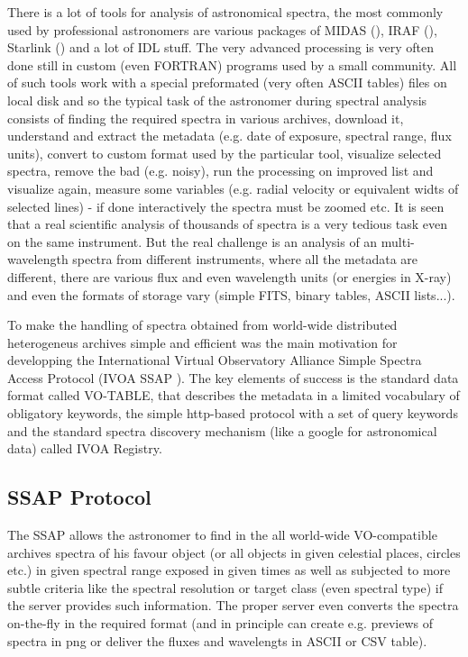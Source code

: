 \documentclass[final,authoryear,5p,times,twocolumn]{elsarticle}
\begin{document}
There is a lot of tools for analysis of astronomical spectra, the most commonly
used by professional astronomers are various packages of MIDAS
(), IRAF (), Starlink () and a lot
of IDL stuff. The very advanced processing is very often done still in custom
(even FORTRAN) programs used by a small community.  All of such tools work with
a special preformated (very often ASCII tables)  files on local disk and so the
typical task of the astronomer during spectral analysis consists of finding the
required spectra in various archives, download it, understand and extract the
metadata (e.g. date of exposure, spectral range, flux units),  convert to
custom format used by the particular tool, visualize selected spectra, remove
the bad (e.g. noisy), run the processing on improved list and visualize again,
measure some variables (e.g. radial velocity or equivalent widts of selected
lines) - if done interactively the spectra must be zoomed etc.  It is seen that
a real scientific analysis of thousands of spectra is a very tedious task even
on the same instrument. But the real challenge is an analysis of an
multi-wavelength spectra from different instruments, where all the metadata are
different, there are various flux and even wavelength units (or energies in
X-ray) and even the formats of storage vary (simple FITS, binary tables, ASCII
lists...).

To make the handling of spectra obtained from world-wide  distributed
heterogeneus archives simple and efficient was the main motivation for
developping the International Virtual Observatory Alliance Simple Spectra
Access Protocol (IVOA SSAP \cite{ssap}). The key elements of success is the standard data
format called VO-TABLE, that describes the metadata in a limited vocabulary of
obligatory keywords, the simple http-based protocol with a set of query keywords
and the standard spectra discovery mechanism (like a google for astronomical
data) called IVOA Registry.


\subsection{SSAP Protocol}


The SSAP allows the astronomer to find in the all world-wide VO-compatible
archives spectra of his favour object (or all objects in given celestial
places, circles etc.) in given spectral range exposed in given times as well as
subjected to more subtle criteria like the spectral resolution or target class
(even spectral type) if the server provides such information.  The proper
server even converts the spectra on-the-fly in the required format (and in
principle can create e.g. previews of spectra in png or deliver the fluxes and
wavelengts in ASCII or CSV table).
\end{document}
